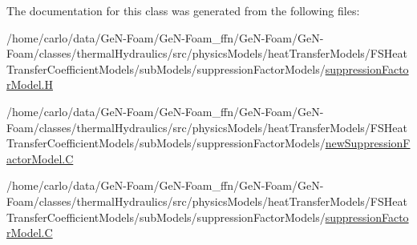 The documentation for this class was generated from the following files\+:\begin{DoxyCompactItemize}
\item 
/home/carlo/data/\+Ge\+N-\/\+Foam/\+Ge\+N-\/\+Foam\+\_\+ffn/\+Ge\+N-\/\+Foam/\+Ge\+N-\/\+Foam/classes/thermal\+Hydraulics/src/physics\+Models/heat\+Transfer\+Models/\+F\+S\+Heat\+Transfer\+Coefficient\+Models/sub\+Models/suppression\+Factor\+Models/\hyperlink{suppressionFactorModel_8H}{suppression\+Factor\+Model.\+H}\item 
/home/carlo/data/\+Ge\+N-\/\+Foam/\+Ge\+N-\/\+Foam\+\_\+ffn/\+Ge\+N-\/\+Foam/\+Ge\+N-\/\+Foam/classes/thermal\+Hydraulics/src/physics\+Models/heat\+Transfer\+Models/\+F\+S\+Heat\+Transfer\+Coefficient\+Models/sub\+Models/suppression\+Factor\+Models/\hyperlink{newSuppressionFactorModel_8C}{new\+Suppression\+Factor\+Model.\+C}\item 
/home/carlo/data/\+Ge\+N-\/\+Foam/\+Ge\+N-\/\+Foam\+\_\+ffn/\+Ge\+N-\/\+Foam/\+Ge\+N-\/\+Foam/classes/thermal\+Hydraulics/src/physics\+Models/heat\+Transfer\+Models/\+F\+S\+Heat\+Transfer\+Coefficient\+Models/sub\+Models/suppression\+Factor\+Models/\hyperlink{suppressionFactorModel_8C}{suppression\+Factor\+Model.\+C}\end{DoxyCompactItemize}
